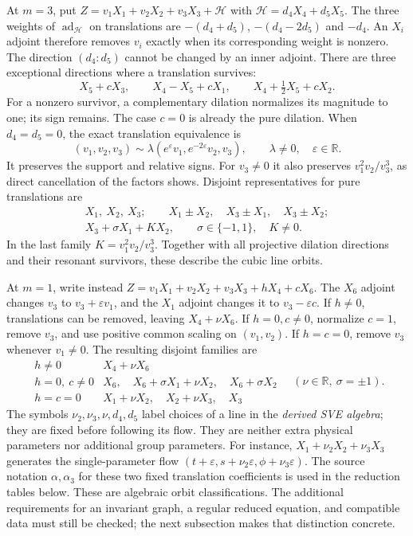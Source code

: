 \documentclass[11pt]{article}
\theoremstyle{definition}
\begin{document}
At $m=3$, put $Z=v_1X_1+v_2X_2+v_3X_3+\mathcal H$ with
$\mathcal H=d_4X_4+d_5X_5$. The three weights of
$\operatorname{ad}_{\mathcal H}$ on translations are
$-(d_4+d_5)$, $-(d_4-2d_5)$ and $-d_4$. An $X_i$ adjoint therefore removes
$v_i$ exactly when its corresponding weight is nonzero. The direction
$(d_4:d_5)$ cannot be changed by an inner adjoint. There are three exceptional
directions where a translation survives:
\[
 X_5+cX_3,\qquad X_4-X_5+cX_1,\qquad
 X_4+\tfrac12X_5+cX_2.
\]
For a nonzero survivor, a complementary dilation normalizes its magnitude
to one; its sign remains. The case $c=0$ is already the pure dilation.
When $d_4=d_5=0$, the exact translation equivalence is
\begin{equation}
 (v_1,v_2,v_3)\sim\lambda(e^\varepsilon v_1,e^{-2\varepsilon}v_2,v_3),
 \qquad \lambda\ne0,\quad\varepsilon\in\mathbb R.
 \label{eq:sve-translation-orbits}
\end{equation}
It preserves the support and relative signs. For $v_3\ne0$ it also
preserves $v_1^2v_2/v_3^3$, as direct cancellation of the factors shows.
Disjoint representatives for pure translations are
\[
 \begin{gathered}
 X_1,\ X_2,\ X_3;\qquad X_1\pm X_2,\quad X_3\pm X_1,\quad X_3\pm X_2;\\
 X_3+\sigma X_1+KX_2,\qquad \sigma\in\{-1,1\},\quad K\ne0.
 \end{gathered}
\]
In the last family $K=v_1^2v_2/v_3^3$. Together with all projective
dilation directions and their resonant survivors, these describe the
cubic line orbits.

At $m=1$, write instead $Z=v_1X_1+v_2X_2+v_3X_3+hX_4+cX_6$.
The $X_6$ adjoint changes $v_3$ to $v_3+\varepsilon v_1$, and the
$X_1$ adjoint changes it to $v_3-\varepsilon c$. If $h\ne0$,
translations can be removed, leaving $X_4+\nu X_6$. If $h=0,c\ne0$,
normalize $c=1$, remove $v_3$, and use positive common scaling on
$(v_1,v_2)$. If $h=c=0$, remove $v_3$ whenever $v_1\ne0$.
The resulting disjoint families are
\[
 \begin{array}{c|l}
 h\ne0 & X_4+\nu X_6\\
 h=0,\ c\ne0 & X_6,\quad X_6+\sigma X_1+\nu X_2,\quad X_6+\sigma X_2\\
 h=c=0 & X_1+\nu X_2,\quad X_2+\nu X_3,\quad X_3
 \end{array}
 \quad(\nu\in\mathbb R,\ \sigma=\pm1).
\]
The symbols $\nu_2,\nu_3,\nu,d_4,d_5$ label choices of a line in the
\emph{derived SVE algebra}; they are fixed before following its flow.
They are neither extra physical parameters nor additional group parameters.
For instance, $X_1+\nu_2X_2+\nu_3X_3$ generates the single-parameter
flow $(t+\varepsilon,s+\nu_2\varepsilon,\phi+\nu_3\varepsilon)$.
The source notation $\alpha,\alpha_3$ for these two fixed translation
coefficients is used in the reduction tables below.
These are algebraic orbit classifications. The additional requirements
for an invariant graph, a regular reduced equation, and compatible data
must still be checked; the next subsection makes that distinction concrete.
\end{document}
